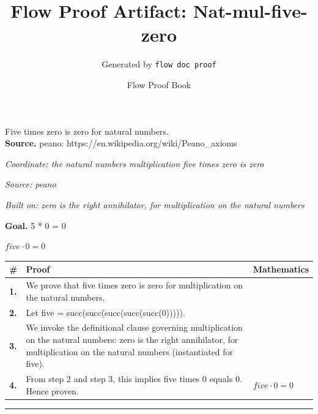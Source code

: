 \documentclass[11pt]{article}
\title{Flow Proof Artifact: Nat-mul-five-zero}
\author{Generated by \texttt{flow doc proof}}
\date{Flow Proof Book}
\theoremstyle{definition}
\begin{document}
\maketitle
Five times zero is zero for natural numbers.\\[0.5em]
\textbf{Source.} peano: https://en.wikipedia.org/wiki/Peano\_axioms\\[0.5em]
\bigskip
{}\par
\smallskip\noindent\textit{Coordinate: the natural numbers \cdot multiplication \cdot five times zero is zero}\par
\smallskip\noindent\textit{Source: peano}\par
\smallskip\noindent\textit{Built on: zero is the right annihilator, for multiplication on the natural numbers}\par
\medskip
\noindent\textbf{Goal.} 5 * 0 = 0\par
\noindent$\displaystyle five \cdot 0 = 0$\par
\medskip
\noindent
\begin{tabular}{@{} >{\raggedright\arraybackslash}p{} >{\raggedright\arraybackslash}p{} >{\raggedleft\arraybackslash}p{} @{}}
\textbf{\#} & \textbf{Proof} & \textbf{Mathematics} \\
\midrule
\textbf{1.} & We prove that five times zero is zero for multiplication on the natural numbers. & \\[0.45em]
\textbf{2.} & Let five = succ(succ(succ(succ(succ(0))))). & \\[0.45em]
\textbf{3.} & We invoke the definitional clause governing multiplication on the natural numbers: zero is the right annihilator, for multiplication on the natural numbers (instantiated for five). & \\[0.45em]
\textbf{4.} & From step 2 and step 3, this implies five times 0 equals 0. Hence proven. & $\displaystyle five \cdot 0 = 0$ \\[0.45em]
\bottomrule
\end{tabular}
\label{thm:Nat-multiplication-five_times_zero_is_zero}
\par\medskip\hrule
\end{document}
